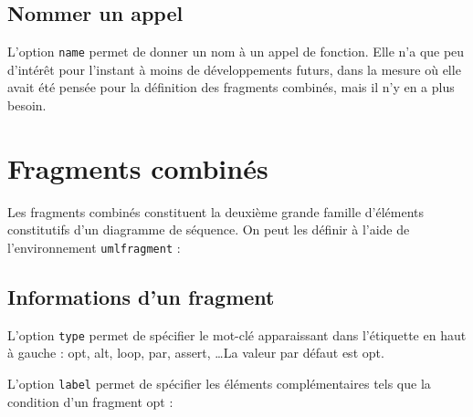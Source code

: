 \documentclass[a4paper,11pt]{report}
\newcommand{\inputTikZ}[1]{%
  }%
\newcommand{\inputTikZ}[1]{%
    \texttt{[image: fig/\#1.pdf]}%
  }%
\begin{document}
\subsection{Nommer un appel}\label{ss.callname}

L'option {\tt name} permet de donner un nom à un appel de fonction. Elle n'a que peu d'intérêt pour l'instant à moins de développements futurs, dans la mesure où elle avait été pensée pour la définition des fragments combinés, mais il n'y en a plus besoin.

\section{Fragments combinés}\label{s.fragments}

Les fragments combinés constituent la deuxième grande famille d'éléments constitutifs d'un diagramme de séquence. On peut les définir à l'aide de l'environnement {\tt umlfragment} :

\medskip

\begin{minipage}{0.5\textwidth}

\end{minipage}
\begin{minipage}{0.5\textwidth}
\begin{center}
\inputTikZ{figure76}
\end{center}
\end{minipage}

\subsection{Informations d'un fragment}\label{ss.fraginfos}

L'option {\tt type} permet de spécifier le mot-clé apparaissant dans l'étiquette en haut à gauche : opt, alt, loop, par, assert, \ldots La valeur par défaut est opt.

L'option {\tt label} permet de spécifier les éléments complémentaires tels que la condition d'un fragment opt : 

\medskip

\begin{minipage}{0.5\textwidth}

\end{minipage}
\begin{minipage}{0.5\textwidth}
\begin{center}
\inputTikZ{figure77}
\end{center}
\end{minipage}
\end{document}

